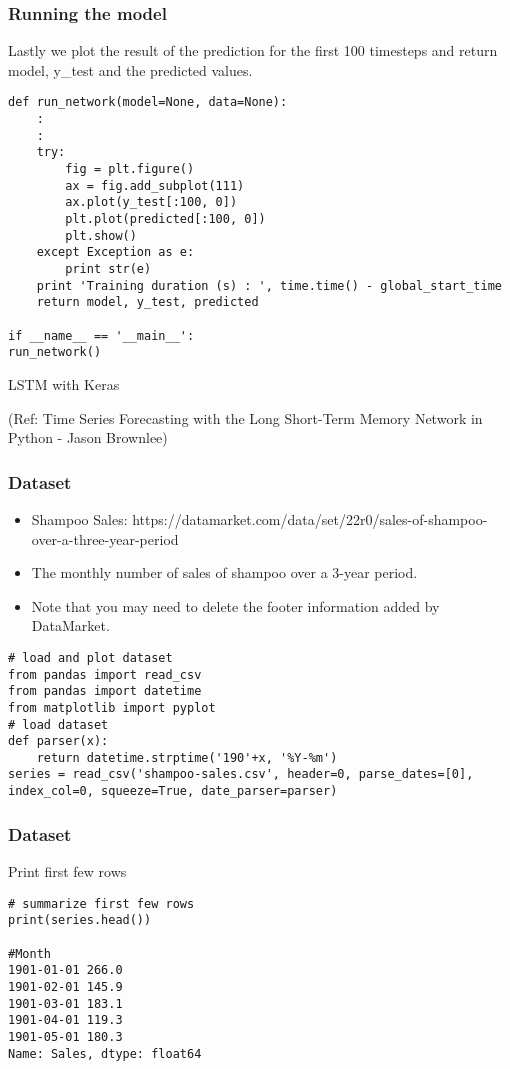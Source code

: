 \begin{frame}[fragile] \frametitle{Running the model}
Lastly we plot the result of the prediction for the first 100 timesteps and return model, y\_test and the predicted values.
\begin{lstlisting}
def run_network(model=None, data=None):
	:
	:
    try:
        fig = plt.figure()
        ax = fig.add_subplot(111)
        ax.plot(y_test[:100, 0])
        plt.plot(predicted[:100, 0])
        plt.show()
    except Exception as e:
        print str(e)
    print 'Training duration (s) : ', time.time() - global_start_time
    return model, y_test, predicted
    
if __name__ == '__main__':
run_network()
\end{lstlisting}           
\end{frame}

\begin{frame}
  \begin{center}
    {\Large LSTM with Keras}
    
(Ref: Time Series Forecasting with the Long Short-Term Memory Network in Python - Jason Brownlee)
  \end{center}
\end{frame}



\begin{frame}[fragile] \frametitle{Dataset}
\begin{itemize}
\item Shampoo Sales: https://datamarket.com/data/set/22r0/sales-of-shampoo-over-a-three-year-period
\item The monthly number of sales of shampoo over a 3-year period.
\item Note that you may need to delete the footer information added by DataMarket.
\end{itemize}
\begin{lstlisting}
# load and plot dataset
from pandas import read_csv
from pandas import datetime
from matplotlib import pyplot
# load dataset
def parser(x):
	return datetime.strptime('190'+x, '%Y-%m')
series = read_csv('shampoo-sales.csv', header=0, parse_dates=[0], index_col=0, squeeze=True, date_parser=parser)
\end{lstlisting}   
\end{frame}

\begin{frame}[fragile] \frametitle{Dataset}
Print first few rows
\begin{lstlisting}
# summarize first few rows
print(series.head())

#Month
1901-01-01 266.0
1901-02-01 145.9
1901-03-01 183.1
1901-04-01 119.3
1901-05-01 180.3
Name: Sales, dtype: float64
\end{lstlisting}   
\end{frame}

